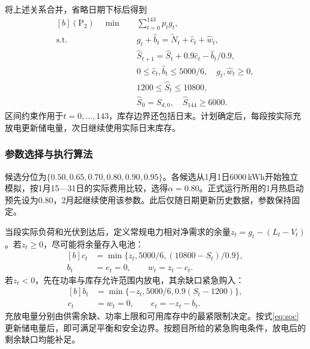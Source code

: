 将上述关系合并，省略日期下标后得到
\begin{equation}
\begin{aligned}[b]
 (\mathrm P_2)\quad \min\quad&\sum_{t=0}^{143}p_tg_t,\\
 \mathrm{s.t.}\quad&g_t+\widehat b_t=\widetilde N_t+\widehat c_t+\widehat w_t,\\
 &\widehat S_{t+1}=\widehat S_t+0.9\widehat c_t-\widehat b_t/0.9,\\
 &0\le\widehat c_t,\widehat b_t\le5000/6,\quad g_t,\widehat w_t\ge0,\\
 &1200\le\widehat S_t\le10800,\\
 &\widehat S_0=S_{d,0},\quad\widehat S_{144}\ge6000.
\end{aligned}\label{eq:q2-summary}
\end{equation}
区间约束作用于$t=0,\ldots,143$，库存边界还包括日末。计划确定后，每段按实际充放电更新储电量，次日继续使用实际日末库存。

\subsubsection{参数选择与执行算法}
候选分位为$\{0.50,0.65,0.70,0.80,0.90,0.95\}$。各候选从1月1日6000\,kWh开始独立模拟，按1月15—31日的实际费用比较，选得$\alpha=0.80$。正式运行所用的1月热启动预先设为0.80，2月起继续使用该参数。此后仅随日期更新历史数据，参数保持固定。

当段实际负荷和光伏到达后，定义常规电力相对净需求的余量$z_t=g_t-(L_t-V_t)$。若$z_t\ge0$，尽可能将余量存入电池：
\begin{equation}
\begin{aligned}[b]
 c_t&=\min\{z_t,5000/6,(10800-S_t)/0.9\},\\
 b_t&=e_t=0,\qquad w_t=z_t-c_t.
\end{aligned}\label{eq:feedback-surplus}
\end{equation}
若$z_t<0$，先在功率与库存允许范围内放电，其余缺口紧急购入：
\begin{equation}
\begin{aligned}[b]
 b_t&=\min\{-z_t,5000/6,0.9(S_t-1200)\},\\
 c_t&=w_t=0,\qquad e_t=-z_t-b_t.
\end{aligned}\label{eq:feedback-shortage}
\end{equation}
充放电量分别由供需余缺、功率上限和可用库存中的最紧限制决定。按式\eqref{eq:soc}更新储电量后，即可满足平衡和安全边界。按题目所给的紧急购电条件，放电后的剩余缺口均能补足。

